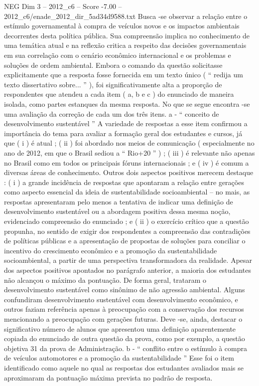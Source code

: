 \begin{textsample}{NEG Dim 3 – 2012\_c6 – Score -7.00 – 2012\_c6/enade\_2012\_dir\_5ad34d9588.txt}
Busca -se observar a relação entre o estímulo governamental à compra de veículos novos e os impactos ambientais decorrentes desta política pública.
Sua compreensão implica no conhecimento de uma temática atual e na reflexão critica a respeito das decisões governamentais em sua correlação com o cenário econômico internacional e os problemas e soluções de ordem ambiental.
Embora o comando da questão solicitasse explicitamente que a resposta fosse fornecida em um texto único ( “ redija um texto dissertativo sobre... ” ), foi significativamente alta a proporção de respondentes que atendeu a cada item ( a, b e c ) do enunciado de maneira isolada, como partes estanques da mesma resposta.
No que se segue encontra -se uma avaliação da correção de cada um dos três itens. a - “ conceito de desenvolvimento sustentável ” A variedade de respostas a esse item confirmou a importância do tema para avaliar a formação geral dos estudantes e cursos, já que ( i ) é atual ; ( ii ) foi abordado nos meios de comunicação ( especialmente no ano de 2012, em que o Brasil sediou a “ Rio+20 ” ) ; ( iii ) é relevante não apenas no Brasil como em todos os principais fóruns internacionais ; e ( iv ) é comum a diversas áreas de conhecimento.
Outros dois aspectos positivos merecem destaque : ( i ) a grande incidência de respostas que apontaram a relação entre gerações como aspecto essencial da ideia de sustentabilidade socioambiental – no mais, as respostas apresentaram pelo menos a tentativa de indicar uma definição de desenvolvimento sustentável ou a abordagem positiva dessa mesma noção, evidenciado compreensão do enunciado ; e ( ii ) o exercício crítico que a questão propunha, no sentido de exigir dos respondentes a compreensão das contradições de políticas públicas e a apresentação de propostas de soluções para conciliar o incentivo do crescimento econômico e a promoção da sustentabilidade socioambiental, a partir de uma perspectiva transformadora da realidade.
Apesar dos aspectos positivos apontados no parágrafo anterior, a maioria dos estudantes não alcançou o máximo da pontuação.
De forma geral, trataram o desenvolvimento sustentável como sinônimo de não agressão ambiental.
Alguns confundiram desenvolvimento sustentável com desenvolvimento econômico, e outros faziam referência apenas à preocupação com a conservação dos recursos mencionando a preocupação com gerações futuras.
Deve -se, ainda, destacar o significativo número de alunos que apresentou uma definição aparentemente copiada do enunciado de outra questão da prova, como por exemplo, a questão objetiva 31 da prova de Administração. b - “ conflito entre o estímulo à compra de veículos automotores e a promoção da sustentabilidade ” Esse foi o item identificado como aquele no qual as respostas dos estudantes avaliados mais se aproximaram da pontuação máxima prevista no padrão de resposta.

\end{textsample}
